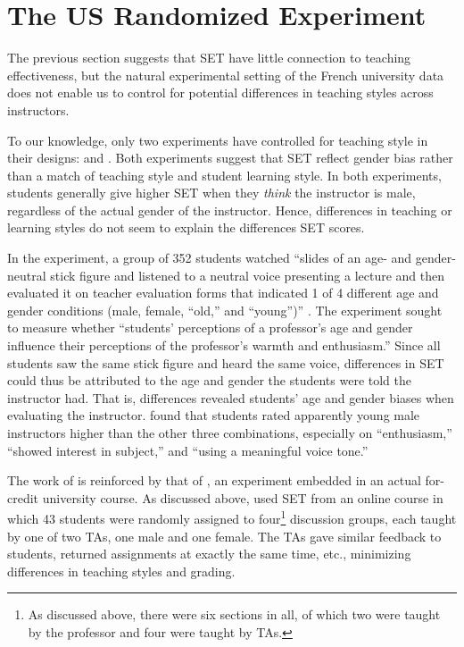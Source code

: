 \documentclass[12pt]{article}
\begin{document}
\section{The US Randomized Experiment}

The previous section suggests that SET have little
connection to teaching effectiveness, but the natural experimental setting of the French 
university data does not enable us to control for potential differences in teaching 
styles across instructors. 

To our knowledge, only two experiments have controlled for teaching style in
their designs: \citet{Arbuckle2003} and \citet{MacNell2014}. 
Both experiments suggest that SET reflect gender bias rather than a match
of teaching style and student learning style. 
In both experiments, students generally give higher SET when they \emph{think} the instructor
is male, regardless of the actual gender of the instructor.
Hence, differences in teaching or learning styles do not seem to explain the differences
SET scores.

In the \citet{Arbuckle2003} experiment, a group of 352 students watched 
``slides of an age- and gender-neutral stick figure and listened to a neutral voice 
presenting a lecture and then evaluated it on teacher evaluation forms that indicated 
1 of 4 different age and gender conditions 
(male, female, ``old,'' and ``young'')'' \citealp[p.507]{Arbuckle2003}. 
The experiment sought to measure whether 
``students' perceptions of a professor's age and gender influence their perceptions of the 
professor's warmth and enthusiasm.'' 
Since all students saw the same stick figure and heard the same voice, differences in SET 
could thus be attributed to the age and gender the students were told the instructor had.
That is, differences revealed students' age and gender biases when evaluating the instructor. 
\citet{Arbuckle2003} found that students rated apparently young male instructors higher 
than the other three combinations, especially on ``enthusiasm,'' ``showed interest in subject,'' 
and ``using a meaningful voice tone.'' 

The work of \citet{Arbuckle2003} is reinforced by that of \citet{MacNell2014},
an experiment embedded in an actual for-credit university course. 
As discussed above, \citet{MacNell2014} used SET from an online course in which 
43 students were randomly assigned to four\footnote{%
As discussed above, there were six sections in all, of which two were taught by the professor and four
were taught by TAs.
} 
discussion groups, each taught by one of two TAs, one male and one female. 
The TAs gave similar feedback to students, returned assignments at exactly the same time, etc., 
minimizing differences in teaching styles and grading.
\end{document}
